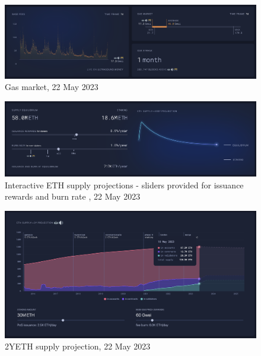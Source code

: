 \documentclass[UTF8]{article}
\begin{document}
{\begin{figure}[htbp]
\begin{center}
\includegraphics[width=0.9\linewidth]{images/gasmarket}
\caption{Gas market, 22 May 2023}
\label{fig:gas}
\end{center}
\end{figure}

\begin{figure}[htbp]
\begin{center}
\includegraphics[width=0.9\linewidth]{images/projection}
\caption{Interactive ETH supply projections - sliders provided for issuance rewards and burn rate , 22 May 2023}
\label{fig:projection}
\end{center}
\end{figure}

\begin{figure}[htbp]
\begin{center}
\includegraphics[width=0.9\linewidth]{images/2yprojection}
\caption{2YETH supply projection, 22 May 2023}
\label{fig:2yprojection}
\end{center}
\end{figure}

}
\end{document}
